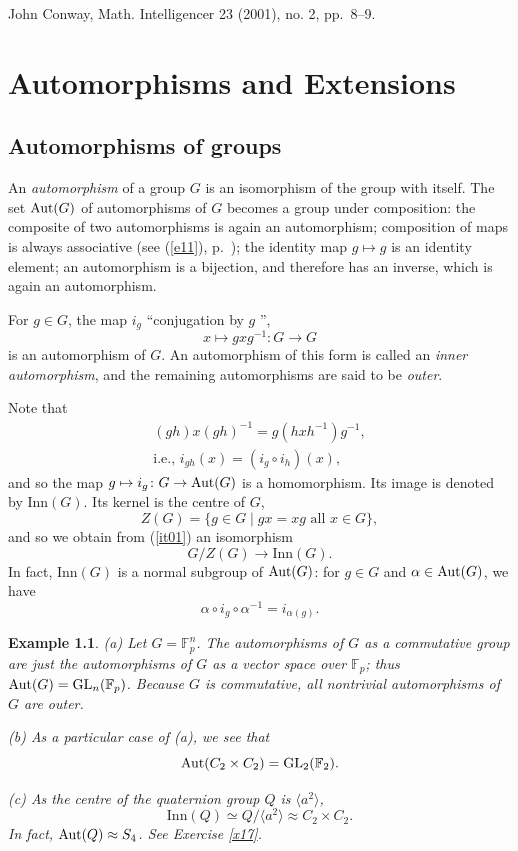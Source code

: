 \documentclass[a4paper,11pt,final]{memoir}%
\newtheorem{example}[X]{Example}
\theoremstyle{nonumberplain}
\begin{document}
{\footnotesize \hfill John Conway, Math. Intelligencer 23 (2001), no. 2,
pp.~8--9.}

\clearpage


\chapter{Automorphisms and Extensions}

\section{Automorphisms of groups}

An \emph{automorphism\/}%
of a group $G$ is an isomorphism of the group with itself. The set $\operatorname{Aut}(G)$
of automorphisms of $G$ becomes a group under composition: the composite of
two automorphisms is again an automorphism; composition of maps is always
associative (see (\ref{e11}), p.~\pageref{e11}); the identity map $g\mapsto g$
is an identity element; an automorphism is a bijection, and therefore has an
inverse, which is again an automorphism.

For $g\in G$, the map $i_{g}$ \textquotedblleft conjugation by $g$%
\textquotedblright,
\[
x\mapsto gxg^{-1}:G\rightarrow G
\]
is an automorphism of $G$. An automorphism of this form is called an
\emph{inner automorphism},%
and the remaining automorphisms are said to be \emph{outer}.%
%


Note that
\begin{align*}
(gh)x(gh)^{-1}=g(hxh^{-1})g^{-1}, \\
\text{i.e., $i_{gh}(x)=(i_{g}\circ
i_{h})(x)$},
\end{align*}
and so the map $g\mapsto i_{g}\colon G\rightarrow\operatorname{Aut}(G)$ is a homomorphism.
Its image is denoted by $\text{Inn}(G)$. Its kernel is the centre of $G$,
\[
Z(G)=\{g\in G\mid gx=xg\text{ all }x\in G\},
\]
and so we obtain from (\ref{it01}) an isomorphism
\[
G/Z(G)\rightarrow\text{Inn}(G).
\]
In fact, $\text{Inn}(G)$ is a normal subgroup of $\operatorname{Aut}(G)$: for $g\in G$ and
$\alpha\in\operatorname{Aut}(G)$, we have
\[
\alpha\circ i_{g}\circ\alpha^{-1}=i_{\alpha(g)}.
\]


\begin{example}
\label{it00a}(a) Let $G=\mathbb{F}_{p}^{n}$. The automorphisms of $G$ as a
commutative group are just the automorphisms of $G$ as a vector space over
$\mathbb{F}_{p}$; thus $\operatorname{Aut}(G)=\operatorname{GL}_{n}(\mathbb{F}_{p})$. Because $G$ is
commutative, all nontrivial automorphisms of $G$ are outer.

(b) As a particular case of (a), we see that
\[
\operatorname{Aut}(C_{2}\times C_{2})=\operatorname{GL}_{2}(\mathbb{F}_{2}).
\]


(c) As the centre of the quaternion group $Q$ is $\langle a^{2}\rangle$,
\[
\text{Inn}(Q)\simeq Q/\langle a^{2}\rangle\approx C_{2}\times C_{2}.
\]
In fact, $\operatorname{Aut}(Q)\approx S_{4}$. See Exercise \ref{x17}.
\end{example}
\end{document}

